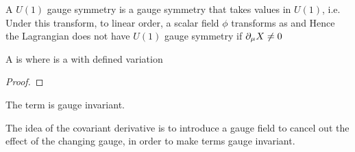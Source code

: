 \documentclass{article}
\begin{document}
\begin{example}
A $U(1)$ gauge symmetry is a gauge symmetry that takes values in $U(1)$, i.e. 
Under this transform, to linear order, a scalar field $\phi$ transforms as  
and
Hence the Lagrangian
does not have $U(1)$ gauge symmetry if $\partial_\mu X \neq 0$
\end{example}

\begin{definition}
A  is 
where
is a  with defined variation 
\end{definition}

\begin{lemma}
\end{lemma}
\begin{proof}
\end{proof}
\begin{corollary}
The term 
is gauge invariant. 
\end{corollary}

\begin{idea}
The idea of the covariant derivative is to introduce a gauge field to cancel out the effect of the changing gauge, in order to make terms 
gauge invariant. 
\end{idea}
\end{document}
